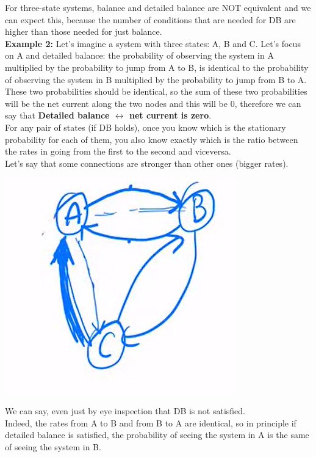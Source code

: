 For three-state systems, balance and detailed balance are NOT equivalent and we can expect this, because the number of conditions that are needed for DB are higher than those needed for just balance.
\smallskip
\\
\textbf{Example 2:}
Let's imagine a system with three states: A, B and C.
Let's focus on A and detailed balance:
the probability of observing the system in A multiplied by the probability to jump from A to B, is identical to the probability of observing the system in B multiplied by the probability to jump from B to A.
These two probabilities should be identical, so the sum of these two probabilities will be the net current along the two nodes and this will be 0, therefore we can say that \textbf{Detailed balance $\leftrightarrow$ net current is zero}.\\
For any pair of states (if DB holds), once you know which is the stationary probability for each of them, you also know exactly which is the ratio between the rates in going from the first to the second and viceversa.\\
Let's say that some connections are stronger than other ones (bigger rates).\\
\begin{center}\includegraphics[scale=0.5]{Monte Carlo/images/lect2/img1}\end{center}
We can say, even just by eye inspection that DB is not satisfied.\\
Indeed, the rates from A to B and from B to A are identical, so in principle if detailed balance is satisfied, the probability of seeing the system in A is the same of seeing the system in B.\\
